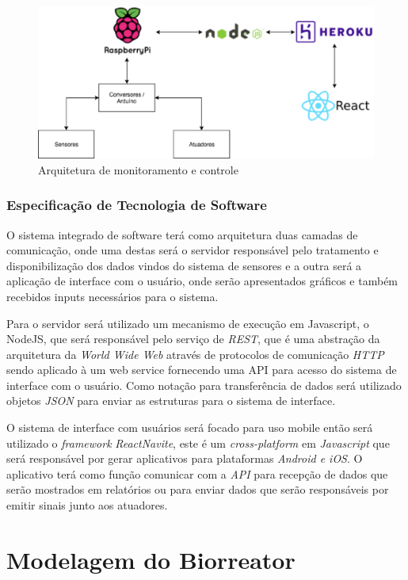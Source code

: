 \begin{figure}[h]
 \centering
 \includegraphics[keepaspectratio=true,scale=0.5]{figuras/arquitetura.eps}
 \caption{Arquitetura de monitoramento e controle}
 \label{arquitetura}
\end{figure}

\subsubsection{Especificação de Tecnologia de Software}

O sistema integrado de software terá como arquitetura duas camadas de comunicação, onde uma destas será o servidor responsável pelo tratamento e disponibilização dos dados vindos do sistema de sensores e a outra será a aplicação de interface com o usuário, onde serão apresentados gráficos e também recebidos inputs necessários para o sistema.

Para o servidor será utilizado um mecanismo de execução em Javascript, o NodeJS, que será responsável pelo serviço de \textit{REST}, que é uma abstração da arquitetura da \textit{World Wide Web} através de protocolos de comunicação \textit{HTTP} sendo aplicado à um web service fornecendo uma API para acesso do sistema de interface com o usuário. Como notação para transferência de dados será utilizado objetos \textit{JSON} para enviar as estruturas para o sistema de interface.

O sistema de interface com usuários será focado para uso mobile então será utilizado o \textit{framework} \textit{ReactNavite}, este é um \textit{cross-platform} em \textit{Javascript} que será responsável por gerar aplicativos para plataformas \textit{Android e iOS}. O aplicativo terá como função comunicar com a \textit{API} para recepção de dados que serão mostrados em relatórios ou para enviar dados que serão responsáveis por emitir sinais junto aos atuadores.

\section{Modelagem do Biorreator}

